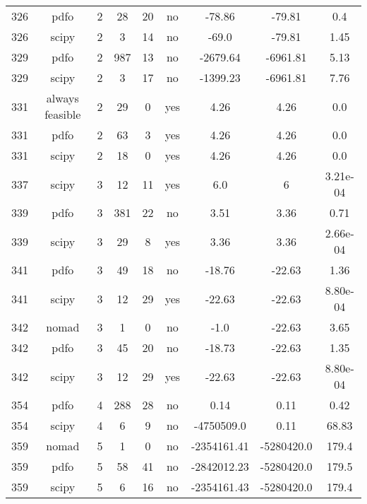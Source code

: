\begin{scriptsize}
\begin{center}
\begin{longtable}{ccccccccc}
326 &            pdfo &  2 &     28 &     20 &      no &      -78.86 &      -79.81 &      0.4\\
326 &           scipy &  2 &      3 &     14 &      no &       -69.0 &      -79.81 &     1.45\\
329 &            pdfo &  2 &    987 &     13 &      no &    -2679.64 &    -6961.81 &     5.13\\
329 &           scipy &  2 &      3 &     17 &      no &    -1399.23 &    -6961.81 &     7.76\\
331 & always feasible &  2 &     29 &      0 &     yes &        4.26 &        4.26 &      0.0\\
331 &            pdfo &  2 &     63 &      3 &     yes &        4.26 &        4.26 &      0.0\\
331 &           scipy &  2 &     18 &      0 &     yes &        4.26 &        4.26 &      0.0\\
337 &           scipy &  3 &     12 &     11 &     yes &         6.0 &           6 & 3.21e-04\\
339 &            pdfo &  3 &    381 &     22 &      no &        3.51 &        3.36 &     0.71\\
339 &           scipy &  3 &     29 &      8 &     yes &        3.36 &        3.36 & 2.66e-04\\
341 &            pdfo &  3 &     49 &     18 &      no &      -18.76 &      -22.63 &     1.36\\
341 &           scipy &  3 &     12 &     29 &     yes &      -22.63 &      -22.63 & 8.80e-04\\
342 &           nomad &  3 &      1 &      0 &      no &        -1.0 &      -22.63 &     3.65\\
342 &            pdfo &  3 &     45 &     20 &      no &      -18.73 &      -22.63 &     1.35\\
342 &           scipy &  3 &     12 &     29 &     yes &      -22.63 &      -22.63 & 8.80e-04\\
354 &            pdfo &  4 &    288 &     28 &      no &        0.14 &        0.11 &     0.42\\
354 &           scipy &  4 &      6 &      9 &      no &  -4750509.0 &        0.11 &    68.83\\
359 &           nomad &  5 &      1 &      0 &      no & -2354161.41 &  -5280420.0 &    179.4\\
359 &            pdfo &  5 &     58 &     41 &      no & -2842012.23 &  -5280420.0 &    179.5\\
359 &           scipy &  5 &      6 &     16 &      no & -2354161.43 &  -5280420.0 &    179.4
\end{longtable}
\end{center}
\end{scriptsize}
